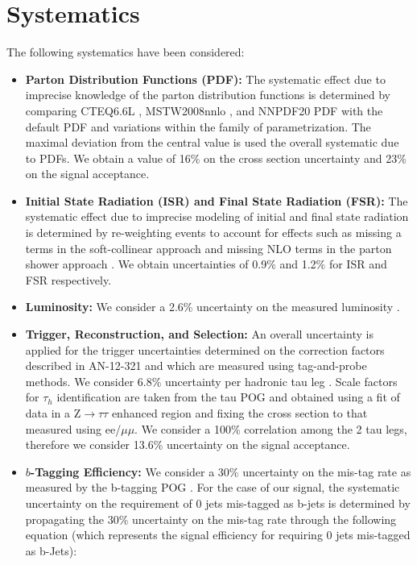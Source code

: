 \clearpage 
\section{Systematics}
\label{sec:systematics}

The following systematics have been considered:

\begin{itemize}
  \item \textbf{Parton Distribution Functions (PDF):} The systematic effect due to imprecise knowledge of the parton 
distribution functions is determined by comparing CTEQ6.6L \cite{Nadolsky:2008zw}, MSTW2008nnlo \cite{Martin:2009iq}, and NNPDF20 PDF \cite{Ubiali:2008uk} with the default PDF and variations within the family of parametrization. The maximal deviation from the central value is used the overall systematic due to PDFs. We obtain a value of 16\% on the cross section uncertainty and 23\% on the signal acceptance.

  \item \textbf{Initial State Radiation (ISR) and Final State Radiation (FSR):} The systematic effect due to imprecise modeling of initial and final state radiation is determined by re-weighting events to account for effects such as missing a terms in the soft-collinear approach \cite{Nanava:2003cg} and missing NLO terms in the parton shower approach \cite{Miu:1998ju}. We obtain uncertainties of 0.9\% and 1.2\% for ISR and FSR respectively.

  \item \textbf{Luminosity:} We consider a 2.6\% uncertainty on the measured luminosity \cite{CMS:2012rua}.
  
  \item \textbf{Trigger, Reconstruction, and Selection:}  An overall uncertainty is applied for the trigger uncertainties determined on the
  correction factors described in AN-12-321 and which are measured using tag-and-probe methods. We consider 6.8\% uncertainty per hadronic tau leg \cite{CMS:2011msa}. Scale factors for $\tau_{h}$ identification are taken from the tau POG and obtained using a fit of data in a Z$\to\tau\tau$ enhanced region and fixing the cross section to that measured using ee/$\mu\mu$. We consider a 100\% correlation among the 2 tau legs, therefore we consider 13.6\% uncertainty on the signal acceptance.

  \item \textbf{$b$-Tagging Efficiency:} We consider a 30\% uncertainty on the mis-tag rate as measured by the b-tagging POG \cite{CMS:2011cra}. For the case of our signal, the systematic uncertainty on the requirement of 0 jets mis-tagged as b-jets is determined by propagating the 30\% uncertainty on the mis-tag rate through the following equation (which represents the signal efficiency for requiring 0 jets mis-tagged as b-Jets):


\end{itemize}
